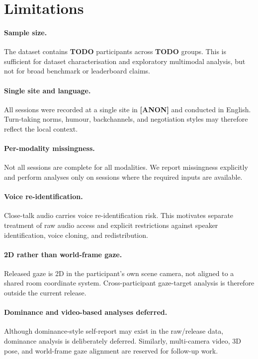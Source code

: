 \documentclass{article}
\begin{document}
\section{Limitations}
\label{sec:limitations}

\paragraph{Sample size.}
The dataset contains \textbf{TODO} participants across \textbf{TODO} groups.
This is sufficient for dataset characterisation and exploratory multimodal
analysis, but not for broad benchmark or leaderboard claims.

\paragraph{Single site and language.}
All sessions were recorded at a single site in \textbf{[ANON]} and conducted
in English.
Turn-taking norms, humour, backchannels, and negotiation styles may therefore
reflect the local context.

\paragraph{Per-modality missingness.}
Not all sessions are complete for all modalities.
We report missingness explicitly and perform analyses only on sessions where
the required inputs are available.

\paragraph{Voice re-identification.}
Close-talk audio carries voice re-identification risk.
This motivates separate treatment of raw audio access and explicit restrictions
against speaker identification, voice cloning, and redistribution.

\paragraph{2D rather than world-frame gaze.}
Released gaze is 2D in the participant's own scene camera, not aligned to a
shared room coordinate system.
Cross-participant gaze-target analysis is therefore outside the current release.

\paragraph{Dominance and video-based analyses deferred.}
Although dominance-style self-report may exist in the raw/release data,
dominance analysis is deliberately deferred.
Similarly, multi-camera video, 3D pose, and world-frame gaze alignment are
reserved for follow-up work.
\end{document}
